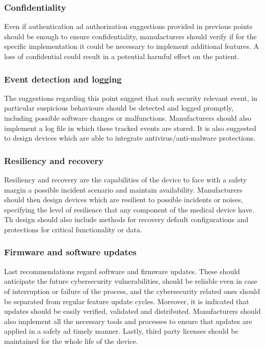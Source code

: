\documentclass{Configuration_Files/PoliMi3i_thesis}
\begin{document}
\subsubsection{Confidentiality} 

Even if authentication ad authorization suggestions provided in previous points should be enough to ensure confidentiality, manufacturers should verify if for the specific implementation it could be necessary to implement additional features. A loss of confidential could result in a potential harmful effect on the patient.
\subsubsection{Event detection and logging} 
The suggestions regarding this point suggest that each security relevant event, in particular suspicious behaviours should be detected and logged promptly, including possible software changes or malfunctions. Manufacturers should also implement a log file in which these tracked events are stored. It is also suggested to design devices which are able to integrate antivirus/anti-malware protections.
\subsubsection{Resiliency and recovery} 
Resiliency and recovery are the capabilities of the device to face with a safety margin a possible incident scenario and maintain availability.
Manufacturers should then design devices which are resilient to possible incidents or noises, specifying the level of resilience that any component of the medical device have. Th design should also include methods for recovery default configurations and protections for critical functionality or data.
\subsubsection{Firmware and software updates} 
Last recommendations regard software and firmware updates. These should anticipate the future cybersecurity vulnerabilities, should be reliable even in case of interruption or failure of the process, and the cybersecurity related ones should be separated from regular feature update cycles. 
Moreover, it is indicated that updates should be easily verified, validated and distributed. Manufacturers should also implement all the necessary tools and processes to ensure that updates are applied in a safely ad timely manner. Lastly, third party licenses should be maintained for the whole life of the device.
\end{document}
